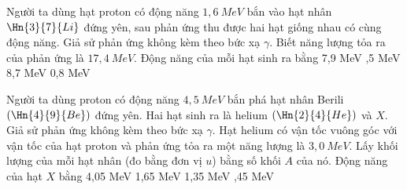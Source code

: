 \begin{vidu}%
 Người ta dùng hạt proton có động năng $1,6\ MeV$ bắn vào hạt nhân $\Hn{3}{7}{Li}$ đứng yên, sau phản ứng thu được hai hạt giống nhau có cùng động năng. Giả sử phản ứng không kèm theo bức xạ $\gamma$. Biết năng lượng tỏa ra của phản ứng là $17,4\ MeV$. Động năng của mỗi hạt sinh ra bằng
\choice
{7,9 MeV}
{,5 MeV}
{8,7 MeV}
{0,8 MeV}
\end{vidu}
\begin{vidu}%
Người ta dùng proton có động năng $4,5\ MeV$ bắn phá hạt nhân Berili $(\Hn{4}{9}{Be})$ đứng yên. Hai hạt sinh ra là helium $(\Hn{2}{4}{He})$ và $X$. Giả sử phản ứng không kèm theo bức xạ $\gamma$. Hạt helium có vận tốc vuông góc với vận tốc của hạt proton và phản ứng tỏa ra một năng lượng là $3,0\ MeV$. Lấy khối lượng của mỗi hạt nhân (đo bằng đơn vị $u$) bằng số khối $A$ của nó. Động năng của hạt $X$ bằng
\choice
{4,05 MeV}
{1,65 MeV}
{1,35 MeV}
{,45 MeV}
\end{vidu}
